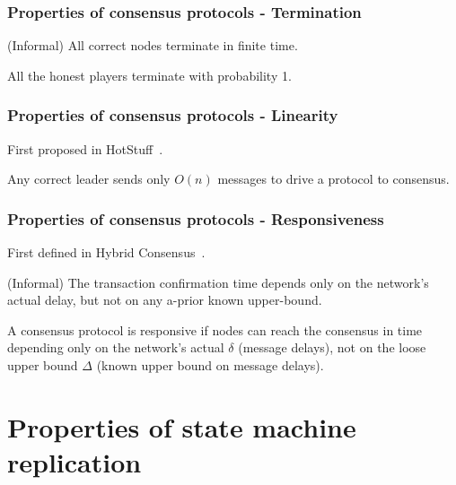 \documentclass{beamer}
\begin{document}
\begin{frame}
\frametitle{Properties of consensus protocols - Termination}

(Informal) All correct nodes terminate in finite time.

\begin{definition}[Termination]
All the honest players terminate with probability 1.
\end{definition}

\end{frame}



\begin{frame}
\frametitle{Properties of consensus protocols - Linearity}

First proposed in HotStuff~\cite{yin2019hotstuff}.

\begin{definition}[Linearity]
Any correct leader sends only $O(n)$ messages to drive a protocol to consensus.
\end{definition}



\end{frame}



\begin{frame}
\frametitle{Properties of consensus protocols - Responsiveness}

First defined in Hybrid Consensus~\cite{pass2017hybrid}.

(Informal) The transaction confirmation time depends only on the network’s actual delay, but not on any a-prior known upper-bound.

\begin{definition}[Responsiveness]
A consensus protocol is responsive if nodes can reach the consensus in time depending only on the network’s actual $\delta$ (message delays), not on the loose upper bound $\Delta$ (known upper bound on message delays).
\end{definition}

\end{frame}



\section{Properties of state machine replication}
\end{document}
